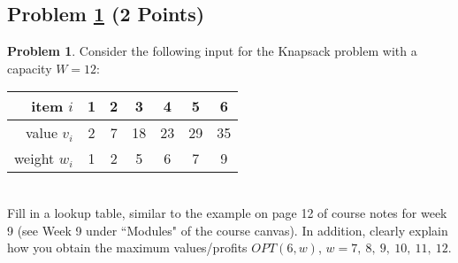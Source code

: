 \documentclass[11pt]{article}
\theoremstyle{definition}
\theoremstyle{definition}
\newtheorem{required}{Problem}
\theoremstyle{definition}
\begin{document}
\subsection{Problem \ref{Recurrence2} (2 Points)}
\begin{required} \label{Recurrence2}
Consider the following input for the Knapsack problem with a capacity $W=12$:\\

 \begin{tabular}{r|c|c|c|c|c|c}
        item $i$  & 1  & 2 &3 &4 &5 &6 \\
                \hline
        value $v_i$ &2 & 7& 18&23 &29 &35 \\
          \hline
        weight $w_i$ & 1 & 2  & 5& 6& 7& 9\\
                 \end{tabular}

\vspace{1mm}
\noindent \\ 
Fill in a lookup table, similar to the example on page 12 of course notes for week 9 (see Week 9 under ``Modules" of the course canvas). In addition, clearly explain how you obtain the maximum values/profits $OPT(6, w)$, $w=7,~8,~9,~10,~11,~12$.

\end{required}
\end{document}
